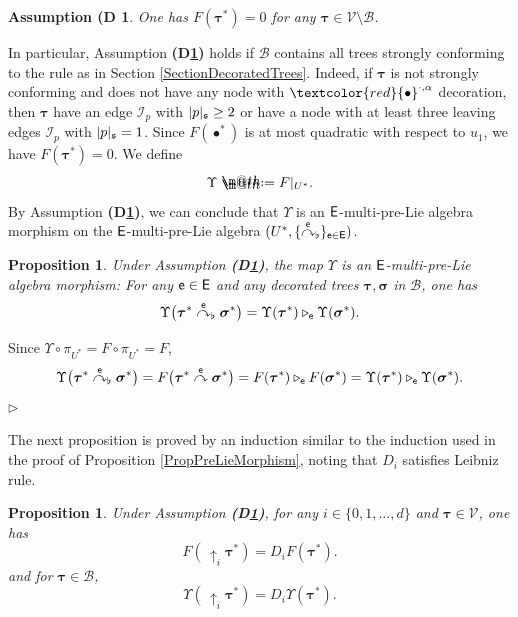 \documentclass[10pt, reqno]{amsart}
\makeatletter
\numberwithin{subsection}{section}
\numberwithin{subsubsection}{subsection}
\numberwithin{equation}{section} %
\newenvironment{Dem}[1][\unskip]{%
    \begin{list}{\hspace{1.15cm}{\sf \textbf{{\small Proof #1 --}}}}{%
        \setlength{\topsep}{0pt}%
        \setlength{\leftmargin}{0pt}%
        \setlength{\rightmargin}{0pt}%
        \setlength{\listparindent}{0pt}%
        \setlength{\itemindent}{0pt}%
        \setlength{\parsep}{0pt}%
        \addtolength{\leftmargin}{0pt}%
        \addtolength{\rightmargin}{0pt}%
    } \item }{\hfill $\rhd$\end{list}\smallskip}
\theoremstyle{mystyle}
\newtheorem{prop}[thm]{\hspace{-0.13cm} {Proposition}}%
\theoremstyle{mystyle2}
\theoremstyle{mystyle3}
\newtheorem{assumD}{Assumption (D}
\newcommand{\refD}[1]{\textbf{\textsf{(D\ref{#1})}}}
\newcommand{\bstau}{\boldsymbol{\tau}}
\newcommand{\bssigma}{\boldsymbol{\sigma}}
\newcommand{\grafting}{\overset{\sf e}{\curvearrowright}}
\newcommand{\flatgrafting}{\overset{\sf e}{\curvearrowright}_{\flat}}
\newcommand{\ssk}{\smallskip}
\newcommand{\mcB}{\mathcal{B}}
\newcommand{\mcI}{\mathcal{I}}
\newcommand\mcV{\mathcal V}
\newcommand*{\defeq}{\mathrel{\rlap{%
                     \raisebox{0.3ex}{$\m@th\cdot$}}%
                     \raisebox{-0.3ex}{$\m@th\cdot$}}%
                     =}
\makeatother
\begin{document}
\medskip

\begin{assumD}\label{D2}
One has $F(\bstau^*)=0$ for any $\bstau\in\mcV\setminus\mcB$.
\end{assumD}

\medskip

In particular, Assumption \refD{D2} holds if $\mcB$ contains all trees strongly conforming to the rule as in Section \ref{SectionDecoratedTrees}. Indeed, if $\bstau$ is not strongly conforming and does not have any node with $\textcolor{red}{\bullet}^{\cdot,\alpha}$ decoration, then $\bstau$ have an edge $\mcI_p$ with $|p|_{\frak{s}}\ge2$ or have a node with at least three leaving edges $\mcI_p$ with $|p|_{\frak{s}}=1$.
Since $F(\bullet^*)$ is at most quadratic with respect to $u_1$, we have $F(\bstau^*)=0$.
We define
$$
\Upsilon\defeq F\vert_{U^*}.
$$
By Assumption \refD{D2}, we can conclude that $\Upsilon$ is an ${\sf E}$-multi-pre-Lie algebra morphism on the ${\sf E}$-multi-pre-Lie algebra $(U^*,\{\grafting_\flat\}_{{\sf e}\in {\sf E}})$.   

\medskip

\begin{prop}
Under Assumption \refD{D2}, the map $\Upsilon$ is an ${\sf E}$-multi-pre-Lie algebra morphism: For any ${\sf e}\in{\sf E}$ and any decorated trees $\bstau, \bssigma$ in $\mcB$, one has
\begin{equation}   \label{EqCharacterizationGrafting}
\Upsilon\big(\bstau^*\flatgrafting\bssigma^*\big) = \Upsilon(\bstau^*)\triangleright_{\sf e} \Upsilon(\bssigma^*).
\end{equation}
\end{prop}   

\medskip

\begin{Dem}
Since $\Upsilon\circ\pi_{U^*}=F\circ\pi_{U^*}=F$,
$$
\Upsilon\big(\bstau^*\flatgrafting\bssigma^*\big) 
=F\big(\bstau^*\grafting\bssigma^*\big)
=F(\bstau^*)\triangleright_{\sf e} F(\bssigma^*)
=\Upsilon(\bstau^*)\triangleright_{\sf e} \Upsilon(\bssigma^*).
$$
\end{Dem}

\medskip

The next proposition is proved by an induction similar to the induction used in the proof of Proposition \ref{PropPreLieMorphism}, noting that $D_i$ satisfies Leibniz rule.

\ssk

\begin{prop}   \label{PropPreLieMorphism2}
Under Assumption \refD{D2}, for any $i\in\{0,1,\dots,d\}$ and $\bstau\in\mcV$, one has
\begin{equation}   \label{EqCharacterizationGrafting2*}
F(\,\uparrow_i\bstau^*) = D_iF(\bstau^*).
\end{equation}
and for $\bstau\in\mcB$,
\begin{equation}   \label{EqCharacterizationGrafting2}
\Upsilon(\,\uparrow_i\bstau^*) = D_i\Upsilon(\bstau^*).
\end{equation}
\end{prop}
\end{document}
